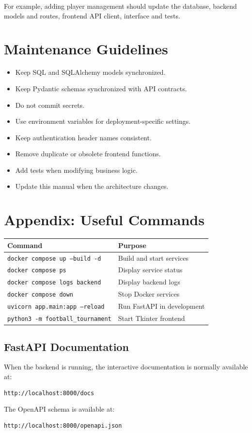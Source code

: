 \documentclass[11pt,a4paper]{article}
\begin{document}
For example, adding player management should update the database,
backend models and routes, frontend API client, interface and tests.

\section{Maintenance Guidelines}

\begin{itemize}
    \item Keep SQL and SQLAlchemy models synchronized.
    \item Keep Pydantic schemas synchronized with API contracts.
    \item Do not commit secrets.
    \item Use environment variables for deployment-specific settings.
    \item Keep authentication header names consistent.
    \item Remove duplicate or obsolete frontend functions.
    \item Add tests when modifying business logic.
    \item Update this manual when the architecture changes.
\end{itemize}

\section{Appendix: Useful Commands}

\begin{longtable}{p{}p{}}
\toprule
\textbf{Command} & \textbf{Purpose}\\
\midrule
\texttt{docker compose up --build -d} & Build and start services\\
\texttt{docker compose ps} & Display service status\\
\texttt{docker compose logs backend} & Display backend logs\\
\texttt{docker compose down} & Stop Docker services\\
\texttt{uvicorn app.main:app --reload} & Run FastAPI in development\\
\texttt{python3 -m football\_tournament} & Start Tkinter frontend\\
\bottomrule
\end{longtable}

\subsection{FastAPI Documentation}

When the backend is running, the interactive documentation is normally
available at:

\begin{lstlisting}
http://localhost:8000/docs
\end{lstlisting}

The OpenAPI schema is available at:

\begin{lstlisting}
http://localhost:8000/openapi.json
\end{lstlisting}
\end{document}
